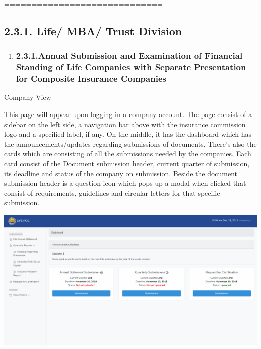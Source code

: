 \documentclass{article}
\begin{document}
\mdhr{}%

\noindent{}=============================%

\subsection{2.3.\hspace*{0.5em}1.  Life/ MBA/ Trust Division}\label{sec-1-life-mba-trust-division}%

\begin{enumerate}[noitemsep,topsep=\mdcompacttopsep]%

\item{}
\subsubsection{2.3.1.\hspace*{0.5em}Annual Submission and Examination of Financial Standing of Life Companies with Separate Presentation for Composite Insurance Companies}\label{sec-annual-submission-and-examination-of-financial-standing-of-life-companies-with-separate-presentation-for-composite-insurance-companies}%
\end{enumerate}%

\noindent{}Company View%

This page will appear upon logging in a company
account. The page consist of a sidebar on the left side, a navigation
bar above with the insurance commission logo and a specified label, if
any. On the middle, it has the dashboard which has the
announcements/updates regarding submissions of documents. There's also
the cards which are consisting of all the submissions needed by the
companies. Each card consist of the Document submission header, current
quarter of submission, its deadline and status of the company on
submission. Beside the document submission header is a question icon
which pops up a modal when clicked that consist of requirements,
guidelines and circular letters for that specific submission.%

\includegraphics[keepaspectratio=true]{up-ic-screens/image111}{}%
\end{document}
